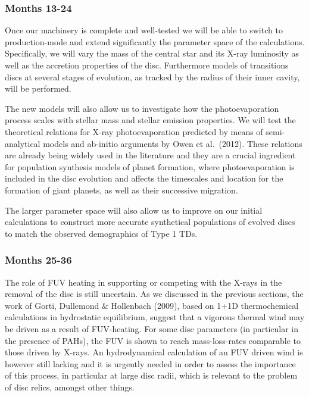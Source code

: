 \documentclass[10pt,fleqn,twoside]{article}
\begin{document}
\subsubsection{Months 13-24}

Once our machinery is complete and well-tested we will be able to
switch to production-mode and extend significantly the parameter space
of the calculations. Specifically, we will vary the mass of the central star and its X-ray
luminosity as well as the accretion properties of the
disc. Furthermore models of transitions discs at several stages 
of evolution, as tracked by the radius of their inner cavity, will be
performed. 


The new models will also allow us to investigate how
the photoevaporation process scales with stellar mass and stellar emission
properties. We will test the theoretical relations for X-ray photoevaporation 
predicted by means of semi-analytical models and ab-initio arguments
by Owen et al.\ (2012). These relations are already being widely used in
the literature and they are a crucial ingredient for population
synthesis models of planet formation, where photoevaporation is
included in the disc evolution and affects the timescales and location for
the formation of giant planets, as well as their successive
migration. 

The larger parameter space will also allow us to improve on our
initial calculations to construct more accurate synthetical
populations of evolved discs to match
the observed demographics of Type 1 TDs.  \\

\subsubsection{Months 25-36} 
The role of FUV heating in supporting or competing with the X-rays in
the removal of the disc is still uncertain. As we discussed in the
previous sections, the work of Gorti, Dullemond \& Hollenbach
(2009), based on 1+1D thermochemical calculations in hydrostatic
equilibrium, suggest that a vigorous thermal wind may be driven as a
result of FUV-heating. For some disc parameters (in particular in the
presence of PAHs), the FUV is shown to reach mass-loss-rates
comparable to those driven by X-rays. An hydrodynamical calculation of
an FUV driven wind is however still lacking and it is urgently needed
in order to assess the importance of this process, in particular at
large disc radii, which is relevant to the problem of disc relics,
amongst other things. 
\end{document}
